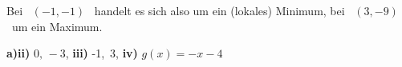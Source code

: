 {\begin{center}
\end{center}

Bei \ $(-1,-1)$ \ handelt es sich also um ein (lokales) Minimum, bei \ $(3,-9)$ \ um ein Maximum.
% 
}

{
\textbf{a)}\textbf{ii)} $0,\, -3$, 
\textbf{iii)} -1,\, 3, 
\textbf{iv)} $g(x)=-x-4$
}
